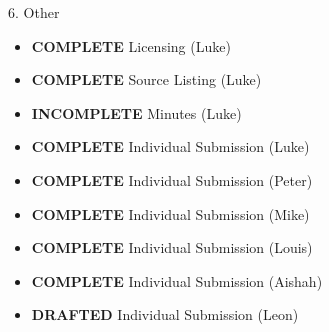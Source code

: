 6. Other
\begin{itemize}
\item \textbf{COMPLETE}   Licensing (Luke)
\item \textbf{COMPLETE}   Source Listing (Luke)
\item \textbf{INCOMPLETE} Minutes (Luke)
\item \textbf{COMPLETE}   Individual Submission (Luke)
\item \textbf{COMPLETE}   Individual Submission (Peter)
\item \textbf{COMPLETE}   Individual Submission (Mike)
\item \textbf{COMPLETE}   Individual Submission (Louis)
\item \textbf{COMPLETE}   Individual Submission (Aishah)
\item \textbf{DRAFTED}    Individual Submission (Leon)
\end{itemize}
